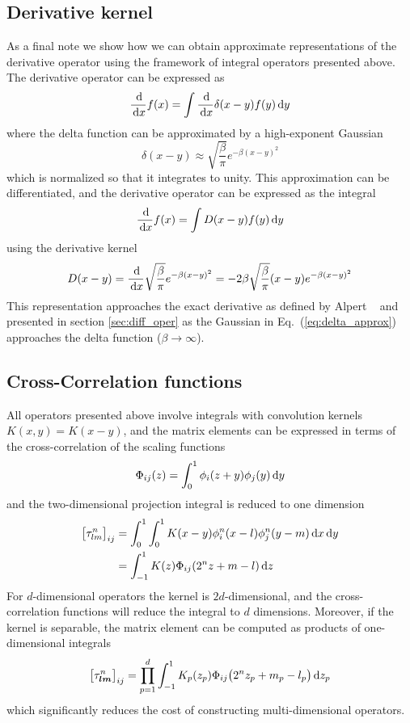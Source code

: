 \subsection{Derivative kernel}
As a final note we show how we can obtain approximate representations of the 
derivative operator using the framework of integral operators presented above. 
The derivative operator can be expressed as
\begin{equation}
    \frac{\,\mathrm{d}}{\,\mathrm{d} x} f(x) = \int \frac{\,\mathrm{d}}{\,\mathrm{d} x} \delta(x-y) f(y) \,\mathrm{d} y
\end{equation}
where the delta function can be approximated by a high-exponent Gaussian
\begin{equation}
    \label{eq:delta_approx}
    \delta(x-y) \approx \sqrt{\frac{\beta}{\pi}} e^{-\beta (x-y)^2}
\end{equation}
which is normalized so that it integrates to unity. This approximation can be 
differentiated, and the derivative operator can be expressed as the integral
\begin{equation}
    \frac{\,\mathrm{d}}{\,\mathrm{d} x} f(x) = \int D(x-y)f(y) \,\mathrm{d} y
\end{equation}
using the derivative kernel
\begin{equation}
    D(x-y)  = \frac{\,\mathrm{d}}{\,\mathrm{d} x} \sqrt{\frac{\beta}{\pi}}e^{-\beta (x-y)^2} 
	    = -2\beta \sqrt{\frac{\beta}{\pi}}(x-y)e^{-\beta (x-y)^2}
\end{equation}
This representation approaches the exact derivative as defined by Alpert 
\etal~\cite{Alpert:2002p149} and presented in section \ref{sec:diff_oper} as 
the Gaussian in Eq.~(\ref{eq:delta_approx}) approaches the delta function 
($\beta \rightarrow \infty$).

\subsection{Cross-Correlation functions}
All operators presented above involve integrals with convolution kernels
$K(x,y) = K(x-y)$, and the matrix elements can be expressed in terms of the
cross-correlation of the scaling functions~\cite{Fann:2004}
\begin{equation}
    \Phi_{ij}(z) = \int_0^1 \phi_i(z+y)\phi_j(y) \,\mathrm{d} y
\end{equation}
and the two-dimensional projection integral is reduced to one dimension
\begin{align}
    \big[\tau_{lm}^n\big]_{ij}
	&= \int_0^1 \int_0^1 K(x-y)\phi_i^n(x-l)\phi_j^n(y-m) \,\mathrm{d} x \,\mathrm{d} y \\
	&= \int_{-1}^1 K(z)\Phi_{ij}(2^nz+m-l)\,\mathrm{d} z
\end{align}
For $d$-dimensional operators the kernel is $2d$-dimensional, and the cross-correlation 
functions will reduce the integral to $d$ dimensions. Moreover, if the kernel is
separable, the matrix element can be computed as products of one-dimensional integrals
\begin{equation}
    \big[\tau_{\boldsymbol l\boldsymbol m}^n\big]_{ij} = \prod_{p=1}^d\int_{-1}^1 
	K_p(z_p)\Phi_{ij}\big(2^nz_p+m_p-l_p\big) \,\mathrm{d} z_p
\end{equation}
which significantly reduces the cost of constructing multi-dimensional operators. 

